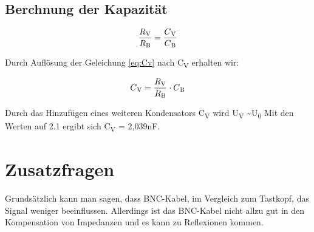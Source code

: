 \subsection{Berchnung der Kapazität}

\begin{equation}
	\frac{R\textsubscript{V}}{R\textsubscript{B}} = \frac{C\textsubscript{V}}{C\textsubscript{B}}
	\label{eq:Cv}
\end{equation}

Durch Auflösung der Geleichung \ref*{eq:Cv} nach C\textsubscript{V}
erhalten wir: 

\begin{equation}
	C\textsubscript{V} = \frac{R\textsubscript{V}}{R\textsubscript{B}} \cdot C\textsubscript{B}
	\label{eq:Cv2}
\end{equation}

Durch das Hinzufügen eines weiteren Kondensators C\textsubscript{V} 
wird U\textsubscript{V} \textasciitilde U\textsubscript{0}
Mit den Werten auf 2.1 ergibt sich C\textsubscript{V} = 2,039nF.

\section{Zusatzfragen}

Grundsätzlich kann man sagen, dass BNC-Kabel, im Vergleich zum Tastkopf,
das Signal weniger beeinflussen. Allerdings ist das BNC-Kabel nicht allzu 
gut in den Kompensation von Impedanzen und es kann zu Reflexionen kommen.




